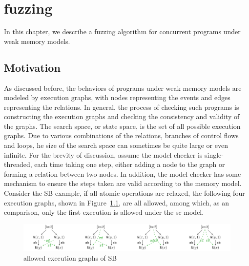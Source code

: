 \chapter{\label{cha:fuzz}fuzzing}

In this chapter, we describe a fuzzing algorithm for concurrent programs under weak memory models.

\section{Motivation}

As discussed before, the behaviors of programs under weak memory models are modeled by execution graphs, with nodes representing the events and edges representing the relations. In general, the process of checking such programs is constructing the execution graphs and checking the consistency and validity of the graphs. The search space, or state space, is the set of all possible execution graphs. Due to various combinations of the relations, branches of control flows and loops, he size of the search space can sometimes be quite large or even infinite. For the brevity of discussion, assume the model checker is single-threaded, each time taking one step, either adding a node to the graph or forming a relation between two nodes. In addition, the model checker has some mechanism to ensure the steps taken are valid according to the memory model. Consider the SB example, if all atomic operations are relaxed, the following four execution graphs, shown in Figure~\ref{SB4}, are all allowed, among which, as an comparison, only the first execution is allowed under the sc model.

\begin{figure}[htbp] %
    \centering
    \includegraphics[scale=0.65]{figure/exec-graph/SB4.pdf} %
    \caption{allowed execution graphs of SB} %
    \label{SB4} %
\end{figure}





